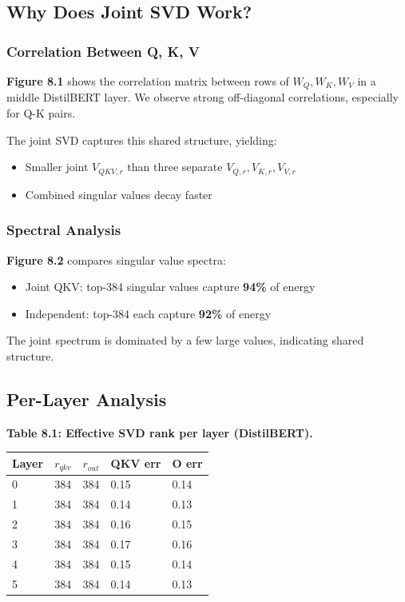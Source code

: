 \subsection{Why Does Joint SVD Work?}

\subsubsection{Correlation Between Q, K, V}

\textbf{Figure 8.1} shows the correlation matrix between rows of $W_Q, W_K, W_V$ 
in a middle DistilBERT layer. We observe strong off-diagonal correlations, 
especially for Q-K pairs.

The joint SVD captures this shared structure, yielding:
\begin{itemize}
\item Smaller joint $V_{QKV, r}$ than three separate $V_{Q,r}, V_{K,r}, V_{V,r}$
\item Combined singular values decay faster

\end{itemize}
\subsubsection{Spectral Analysis}

\textbf{Figure 8.2} compares singular value spectra:
\begin{itemize}
\item Joint QKV: top-384 singular values capture \textbf{94\%} of energy
\item Independent: top-384 each capture \textbf{92\%} of energy

\end{itemize}
The joint spectrum is dominated by a few large values, indicating shared 
structure.

\subsection{Per-Layer Analysis}

\textbf{Table 8.1: Effective SVD rank per layer (DistilBERT).}

\begin{table}[H]
\centering
\small
\begin{tabular}{lllll}
\toprule
\textbf{Layer} & \textbf{$r_{qkv}$} & \textbf{$r_{out}$} & \textbf{QKV err} & \textbf{O err} \\
\midrule
0 & 384 & 384 & 0.15 & 0.14 \\
1 & 384 & 384 & 0.14 & 0.13 \\
2 & 384 & 384 & 0.16 & 0.15 \\
3 & 384 & 384 & 0.17 & 0.16 \\
4 & 384 & 384 & 0.15 & 0.14 \\
5 & 384 & 384 & 0.14 & 0.13 \\
\bottomrule
\end{tabular}
\end{table}

